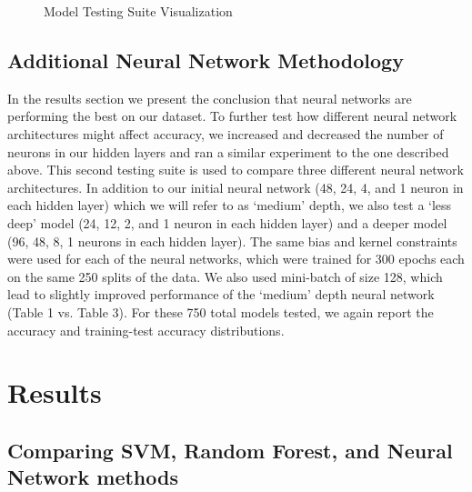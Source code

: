 \documentclass[12pt]{article}
\begin{document}
\begin{figure}[H]
\caption{Model Testing Suite Visualization}
\end{figure}

\subsection{Additional Neural Network Methodology}

In the results section we present the conclusion that neural networks are performing the best on our dataset. To further test how different neural network architectures might affect accuracy, we increased and decreased the number of neurons in our hidden layers and ran a similar experiment to the one described above. This second testing suite is used to compare three different neural network architectures. In addition to our initial neural network (48, 24, 4, and 1 neuron in each hidden layer) which we will refer to as `medium’ depth, we also test a `less deep’ model (24, 12, 2, and 1 neuron in each hidden layer) and a deeper model (96, 48, 8, 1 neurons in each hidden layer). The same bias and kernel constraints were used for each of the neural networks, which were trained for 300 epochs each on the same 250 splits of the data. We also used mini-batch of size 128, which lead to slightly improved performance of the `medium’ depth neural network (Table 1 vs. Table 3). For these 750 total models tested, we again report the accuracy and training-test accuracy distributions.

\section{Results}

\subsection{Comparing SVM, Random Forest, and Neural Network methods}
\end{document}
